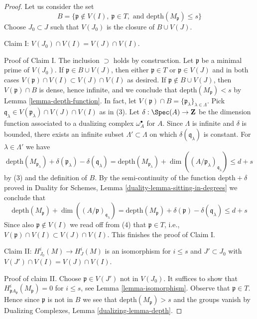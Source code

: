 \begin{proof}
Let us consider the set
$$
B = \{\mathfrak p \not \in V(I),\ \mathfrak p \in T,\text{ and }
\text{depth}(M_\mathfrak p) \leq s\}
$$
Choose $J_0 \subset J$ such that $V(J_0)$ is the closure of $B \cup V(J)$.

\medskip\noindent
Claim I: $V(J_0) \cap V(I) = V(J) \cap V(I)$.

\medskip\noindent
Proof of Claim I. The inclusion $\supset$ holds by construction.
Let $\mathfrak p$ be a minimal prime of $V(J_0)$.
If $\mathfrak p \in B \cup V(J)$, then either $\mathfrak p \in T$
or $\mathfrak p \in V(J)$ and in both cases
$V(\mathfrak p) \cap V(I) \subset V(J) \cap V(I)$ as desired.
If $\mathfrak p \not \in B \cup V(J)$, then
$V(\mathfrak p) \cap B$ is dense, hence infinite, and we conclude that
$\text{depth}(M_\mathfrak p) < s$ by Lemma \ref{lemma-depth-function}.
In fact, let
$V(\mathfrak p) \cap B = \{\mathfrak p_\lambda\}_{\lambda \in \Lambda}$.
Pick $\mathfrak q_\lambda \in V(\mathfrak p_\lambda) \cap V(J) \cap V(I)$
as in (3).
Let $\delta : \Spec(A) \to \mathbf{Z}$ be the dimension function
associated to a dualizing complex $\omega_A^\bullet$ for $A$.
Since $\Lambda$ is infinite and $\delta$ is bounded,
there exists an infinite subset $\Lambda' \subset \Lambda$ on which
$\delta(\mathfrak q_\lambda)$ is constant. For
$\lambda \in \Lambda'$ we have
$$
\text{depth}(M_{\mathfrak p_\lambda}) +
\delta(\mathfrak p_\lambda) - \delta(\mathfrak q_\lambda) =
\text{depth}(M_{\mathfrak p_\lambda}) +
\dim((A/\mathfrak p_\lambda)_{\mathfrak q_\lambda})
\leq d + s
$$
by (3) and the definition of $B$. By the semi-continuity of
the function $\text{depth} + \delta$ proved in
Duality for Schemes, Lemma \ref{duality-lemma-sitting-in-degrees}
we conclude that
$$
\text{depth}(M_\mathfrak p) +
\dim((A/\mathfrak p)_{\mathfrak q_\lambda}) =
\text{depth}(M_\mathfrak p) + \delta(\mathfrak p) - \delta(\mathfrak q_\lambda)
\leq d + s
$$
Since also $\mathfrak p \not \in V(I)$ we read off from (4) that
$\mathfrak p \in T$, i.e.,
$V(\mathfrak p) \cap V(I) \subset V(J) \cap V(I)$. This finishes the
proof of Claim I.

\medskip\noindent
Claim II: $H^i_{J_0}(M) \to H^i_J(M)$ is an isomorphism for $i \leq s$
and $J' \subset J_0$ with $V(J') \cap V(I) = V(J) \cap V(I)$.

\medskip\noindent
Proof of claim II. Choose $\mathfrak p \in V(J')$ not in $V(J_0)$.
It suffices to show that $H^i_{\mathfrak pA_\mathfrak p}(M_\mathfrak p) = 0$
for $i \leq s$, see Lemma \ref{lemma-isomorphism}.
Observe that $\mathfrak p \in T$. Hence since $\mathfrak p$ is not in $B$
we see that $\text{depth}(M_\mathfrak p) > s$ and the groups vanish by
Dualizing Complexes, Lemma \ref{dualizing-lemma-depth}.


\end{proof}
